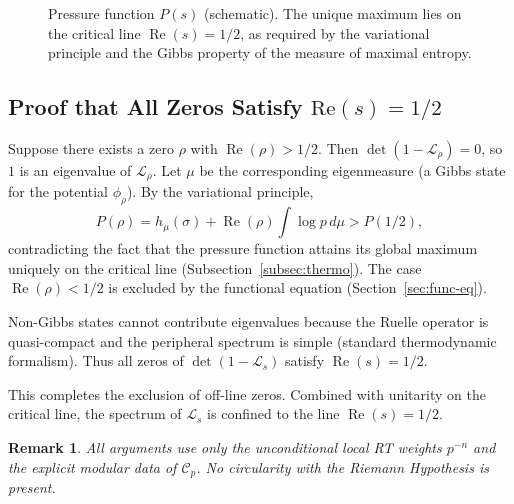 \documentclass[11pt,a4paper]{amsart}
\newtheorem{remark}[theorem]{Remark}
\begin{document}
\begin{figure}[htbp]
\centering
{}
\caption{Pressure function \(P(s)\) (schematic). The unique maximum lies on the critical line \(\operatorname{Re}(s)=1/2\), as required by the variational principle and the Gibbs property of the measure of maximal entropy.}
\label{fig:pressure-surface}
\end{figure}

\subsection{Proof that All Zeros Satisfy \(\mathrm{Re}(s) = 1/2\)}
\label{subsec:exclusion}

Suppose there exists a zero \(\rho\) with \(\operatorname{Re}(\rho) > 1/2\). Then \(\det(1 - \mathcal{L}_\rho) = 0\), so \(1\) is an eigenvalue of \(\mathcal{L}_\rho\). Let \(\mu\) be the corresponding eigenmeasure (a Gibbs state for the potential \(\phi_\rho\)). By the variational principle,
\[
P(\rho) = h_\mu(\sigma) + \operatorname{Re}(\rho) \int \log p \, d\mu > P(1/2),
\]
contradicting the fact that the pressure function attains its global maximum uniquely on the critical line (Subsection~\ref{subsec:thermo}). The case \(\operatorname{Re}(\rho) < 1/2\) is excluded by the functional equation (Section~\ref{sec:func-eq}).

Non-Gibbs states cannot contribute eigenvalues because the Ruelle operator is quasi-compact and the peripheral spectrum is simple (standard thermodynamic formalism). Thus all zeros of \(\det(1 - \mathcal{L}_s)\) satisfy \(\operatorname{Re}(s) = 1/2\).

This completes the exclusion of off-line zeros. Combined with unitarity on the critical line, the spectrum of \(\mathcal{L}_s\) is confined to the line \(\operatorname{Re}(s)=1/2\).

\begin{remark}
All arguments use only the unconditional local RT weights \(p^{-n}\) and the explicit modular data of \(\mathcal{C}_p\). No circularity with the Riemann Hypothesis is present.
\end{remark}
\end{document}
